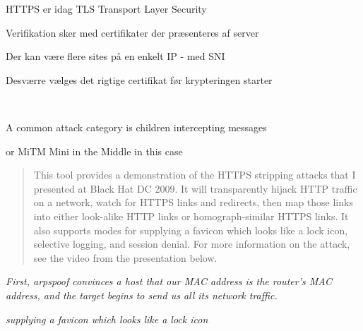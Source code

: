 \documentclass[Screen16to9,17pt]{foils}
\begin{document}
\begin{list2}
\item HTTPS er idag TLS Transport Layer Security
\item Verifikation sker med certifikater der præsenteres af server
\item Der kan være flere sites på en enkelt IP - med SNI
\item Desværre vælges det rigtige certifikat før krypteringen starter
\end{list2}






{~}

\begin{list2}
\item A common attack category is children intercepting messages
\item or MiTM Mini in the Middle in this case
\end{list2}



\begin{quote}
This tool provides a demonstration of the HTTPS stripping attacks that I presented at Black Hat DC 2009. It will transparently hijack HTTP traffic on a network, watch for HTTPS links and redirects, then map those links into either look-alike HTTP links or homograph-similar HTTPS links. It also supports modes for supplying a favicon which looks like a lock icon, selective logging, and session denial. For more information on the attack, see the video from the presentation below.
\end{quote}


\begin{list2}
\item \emph{First, arpspoof convinces a host that our MAC address is the router’s MAC address, and the target begins to send us all its network traffic.}
\item \emph{supplying a favicon which looks like a lock icon}
\end{list2}


\end{document}
